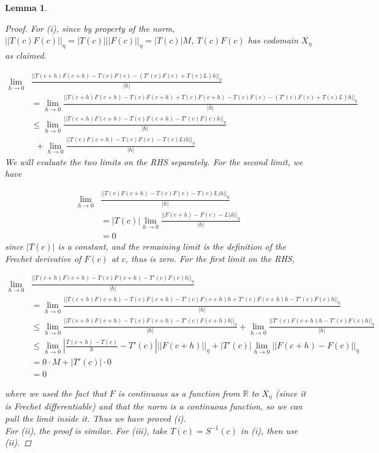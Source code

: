 \documentclass[12pt]{article}
\def\R{{\mathbb R}}
\newtheorem{lemma}{Lemma}
\begin{document}
\begin{lemma}
\begin{proof}
For (i), since by property of the norm, $||T(c)F(c)||_\eta = |T(c)| ||F(c)||_\eta = |T(c)|M$, $T(c)F(c)$ has codomain $X_\eta$ as claimed.

\begin{align*}
\lim_{h \rightarrow 0}&\frac{||T(c+h)F(c+h) - T(c)F(c) - (T'(c)F(c) + T(c)L)h||_\eta}{|h|} \\
&= \lim_{h \rightarrow 0}\frac{||T(c+h)F(c+h) - T(c)F(c+h) + T(c)F(c+h) - T(c)F(c) - (T'(c)F(c) + T(c)L)h||_\eta}{|h|} \\
&\leq \lim_{h \rightarrow 0}\frac{||T(c+h)F(c+h) - T(c)F(c+h) - T'(c)F(c) h ||_\eta}{|h|} \\
&\:\:+ \lim_{h \rightarrow 0}\frac{||T(c)F(c+h) - T(c)F(c) - T(c)L)h||_\eta}{|h|}
\end{align*}
We will evaluate the two limits on the RHS separately. For the second limit, we have

\begin{align*}
\lim_{h \rightarrow 0}&\frac{||T(c)F(c+h) - T(c)F(c) - T(c)L)h||_\eta}{|h|} \\
&= |T(c)| \lim_{h \rightarrow 0}\frac{||F(c+h) - F(c) - L)h||_\eta}{|h|} \\
&= 0
\end{align*}
since $|T(c)|$ is a constant, and the remaining limit is the definition of the Frechet derivative of $F(c)$ at $c$, thus is zero. For the first limit on the RHS,

\begin{align*}
\lim_{h \rightarrow 0}&\frac{||T(c+h)F(c+h) - T(c)F(c+h) - T'(c)F(c) h ||_\eta}{|h|} \\
&= \lim_{h \rightarrow 0}\frac{||T(c+h)F(c+h) - T(c)F(c+h) - T'(c)F(c+h)h + T'(c)F(c+h)h - T'(c)F(c) h ||_\eta}{|h|} \\
&\leq \lim_{h \rightarrow 0}\frac{||T(c+h)F(c+h) - T(c)F(c+h) - T'(c)F(c+h)h||_\eta}{|h|} + \lim_{h \rightarrow 0} \frac{||T'(c)F(c+h)h - T'(c)F(c) h ||_\eta}{|h|} \\
&\leq \lim_{h \rightarrow 0} \left| \frac{T(c+h) - T(c)}{h} - T'(c) \right| ||F(c+h)||_\eta + |T'(c)| \lim_{h \rightarrow 0} ||F(c+h) - F(c) ||_\eta \\
&= 0 \cdot M + |T'(c)| \cdot 0 \\
&= 0
\end{align*}

where we used the fact that $F$ is continuous as a function from $\R$ to $X_\eta$ (since it is Frechet differentiable) and that the norm is a continuous function, so we can pull the limit inside it. Thus we have proved (i).\\

For (ii), the proof is similar. For (iii), take $T(c) = S^{-1}(c)$ in (i), then use (ii).

\end{proof}
\end{lemma}
\end{document}
